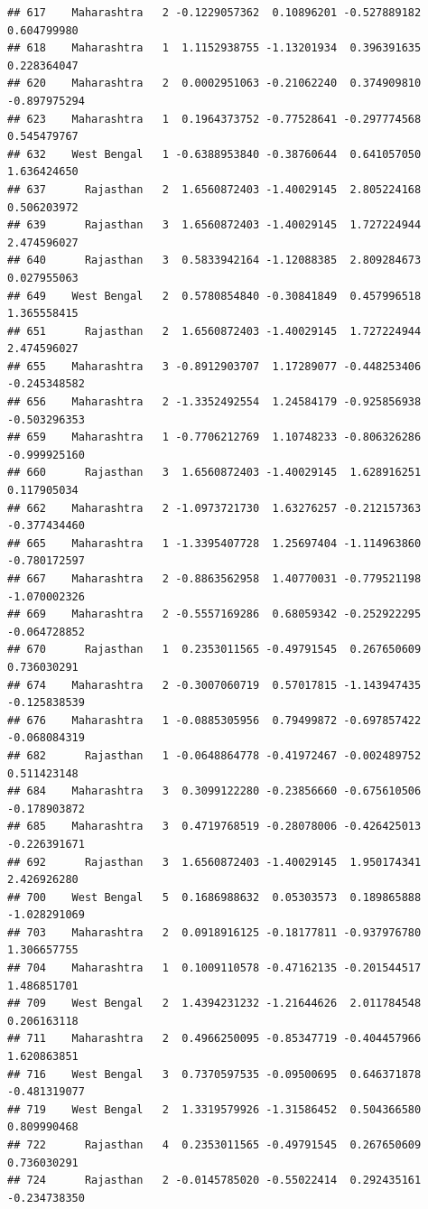 \documentclass[
]{article}
\begin{document}
\begin{verbatim}
## 617    Maharashtra   2 -0.1229057362  0.10896201 -0.527889182  0.604799980
## 618    Maharashtra   1  1.1152938755 -1.13201934  0.396391635  0.228364047
## 620    Maharashtra   2  0.0002951063 -0.21062240  0.374909810 -0.897975294
## 623    Maharashtra   1  0.1964373752 -0.77528641 -0.297774568  0.545479767
## 632    West Bengal   1 -0.6388953840 -0.38760644  0.641057050  1.636424650
## 637      Rajasthan   2  1.6560872403 -1.40029145  2.805224168  0.506203972
## 639      Rajasthan   3  1.6560872403 -1.40029145  1.727224944  2.474596027
## 640      Rajasthan   3  0.5833942164 -1.12088385  2.809284673  0.027955063
## 649    West Bengal   2  0.5780854840 -0.30841849  0.457996518  1.365558415
## 651      Rajasthan   2  1.6560872403 -1.40029145  1.727224944  2.474596027
## 655    Maharashtra   3 -0.8912903707  1.17289077 -0.448253406 -0.245348582
## 656    Maharashtra   2 -1.3352492554  1.24584179 -0.925856938 -0.503296353
## 659    Maharashtra   1 -0.7706212769  1.10748233 -0.806326286 -0.999925160
## 660      Rajasthan   3  1.6560872403 -1.40029145  1.628916251  0.117905034
## 662    Maharashtra   2 -1.0973721730  1.63276257 -0.212157363 -0.377434460
## 665    Maharashtra   1 -1.3395407728  1.25697404 -1.114963860 -0.780172597
## 667    Maharashtra   2 -0.8863562958  1.40770031 -0.779521198 -1.070002326
## 669    Maharashtra   2 -0.5557169286  0.68059342 -0.252922295 -0.064728852
## 670      Rajasthan   1  0.2353011565 -0.49791545  0.267650609  0.736030291
## 674    Maharashtra   2 -0.3007060719  0.57017815 -1.143947435 -0.125838539
## 676    Maharashtra   1 -0.0885305956  0.79499872 -0.697857422 -0.068084319
## 682      Rajasthan   1 -0.0648864778 -0.41972467 -0.002489752  0.511423148
## 684    Maharashtra   3  0.3099122280 -0.23856660 -0.675610506 -0.178903872
## 685    Maharashtra   3  0.4719768519 -0.28078006 -0.426425013 -0.226391671
## 692      Rajasthan   3  1.6560872403 -1.40029145  1.950174341  2.426926280
## 700    West Bengal   5  0.1686988632  0.05303573  0.189865888 -1.028291069
## 703    Maharashtra   2  0.0918916125 -0.18177811 -0.937976780  1.306657755
## 704    Maharashtra   1  0.1009110578 -0.47162135 -0.201544517  1.486851701
## 709    West Bengal   2  1.4394231232 -1.21644626  2.011784548  0.206163118
## 711    Maharashtra   2  0.4966250095 -0.85347719 -0.404457966  1.620863851
## 716    West Bengal   3  0.7370597535 -0.09500695  0.646371878 -0.481319077
## 719    West Bengal   2  1.3319579926 -1.31586452  0.504366580  0.809990468
## 722      Rajasthan   4  0.2353011565 -0.49791545  0.267650609  0.736030291
## 724      Rajasthan   2 -0.0145785020 -0.55022414  0.292435161 -0.234738350

\end{verbatim}
\end{document}

